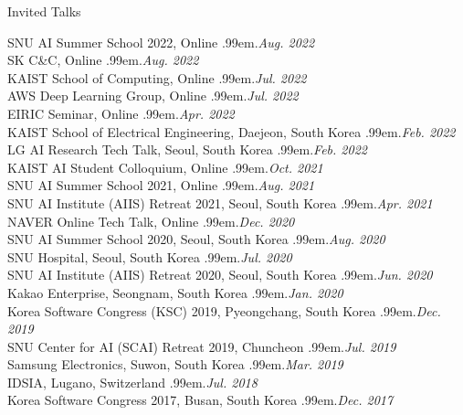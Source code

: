 \documentclass{resume} %
\makeatletter
\newcommand \Dotfill {\leavevmode \cleaders \hb@xt@ .99em{\hss .\hss }\hfill \kern \z@}
\makeatother
\begin{document}

\begin{rSection}{Invited Talks}

SNU AI Summer School 2022, Online \smallskip \Dotfill \emph{Aug. 2022} \\ 
SK C\&C, Online \smallskip \Dotfill \emph{Aug. 2022} \\ 
KAIST School of Computing, Online \smallskip \Dotfill \emph{Jul. 2022} \\ 
AWS Deep Learning Group, Online \smallskip \Dotfill \emph{Jul. 2022} \\ 
EIRIC Seminar, Online \smallskip \Dotfill \emph{Apr. 2022} \\ 
KAIST School of Electrical Engineering, Daejeon, South Korea \smallskip \Dotfill \emph{Feb. 2022} \\ 
LG AI Research Tech Talk, Seoul, South Korea \smallskip \Dotfill \emph{Feb. 2022} \\ 
KAIST AI Student Colloquium, Online \smallskip \Dotfill \emph{Oct. 2021} \\ 
SNU AI Summer School 2021, Online \smallskip \Dotfill \emph{Aug. 2021} \\ 
SNU AI Institute (AIIS) Retreat 2021, Seoul, South Korea \smallskip \Dotfill \emph{Apr. 2021} \\ 
NAVER Online Tech Talk, Online \smallskip \Dotfill \emph{Dec. 2020} \\ 
SNU AI Summer School 2020, Seoul, South Korea \smallskip \Dotfill \emph{Aug. 2020} \\ 
SNU Hospital, Seoul, South Korea \smallskip \Dotfill \emph{Jul. 2020} \\ 
SNU AI Institute (AIIS) Retreat 2020, Seoul, South Korea \smallskip \Dotfill \emph{Jun. 2020}\\ 
Kakao Enterprise, Seongnam, South Korea \smallskip \Dotfill \emph{Jan. 2020} \\ 
Korea Software Congress (KSC) 2019, Pyeongchang, South Korea \smallskip \Dotfill \emph{Dec. 2019} \\ 
SNU Center for AI (SCAI) Retreat 2019, Chuncheon \smallskip \Dotfill \emph{Jul. 2019} \\ 
Samsung Electronics, Suwon, South Korea \smallskip \Dotfill \emph{Mar. 2019} \\ 
IDSIA, Lugano, Switzerland \smallskip \Dotfill \emph{Jul. 2018} \\ 
Korea Software Congress 2017, Busan, South Korea \smallskip \Dotfill \emph{Dec. 2017}

\end{rSection}
\end{document}

